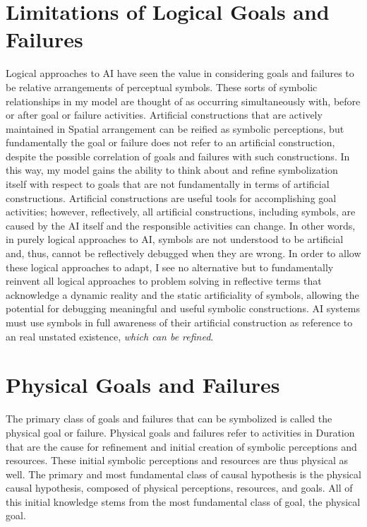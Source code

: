 \section{Limitations of Logical Goals and Failures}

Logical approaches to AI have seen the value in considering goals and
failures to be relative arrangements of perceptual symbols.  These
sorts of symbolic relationships in my model are thought of as
occurring simultaneously with, before or after goal or failure
activities.  Artificial constructions that are actively maintained in
Spatial arrangement can be reified as symbolic perceptions, but
fundamentally the goal or failure does not refer to an artificial
construction, despite the possible correlation of goals and failures
with such constructions.  In this way, my model gains the ability to
think about and refine symbolization itself with respect to goals that
are not fundamentally in terms of artificial constructions.
Artificial constructions are useful tools for accomplishing goal
activities; however, reflectively, all artificial constructions,
including symbols, are caused by the AI itself and the responsible
activities can change.  In other words, in purely logical approaches
to AI, symbols are not understood to be artificial and, thus, cannot
be reflectively debugged when they are wrong.  In order to allow these
logical approaches to adapt, I see no alternative but to fundamentally
reinvent all logical approaches to problem solving in reflective terms
that acknowledge a dynamic reality and the static artificiality of
symbols, allowing the potential for debugging meaningful and useful
symbolic constructions.  AI systems must use symbols in full awareness
of their artificial construction as reference to an real unstated
existence, \emph{which can be refined}.

\section{Physical Goals and Failures}

The primary class of goals and failures that can be symbolized is
called the physical goal or failure.  Physical goals and failures
refer to activities in Duration that are the cause for refinement and
initial creation of symbolic perceptions and resources.  These initial
symbolic perceptions and resources are thus physical as well.  The
primary and most fundamental class of causal hypothesis is the
physical causal hypothesis, composed of physical perceptions,
resources, and goals.  All of this initial knowledge stems from the
most fundamental class of goal, the physical goal.

